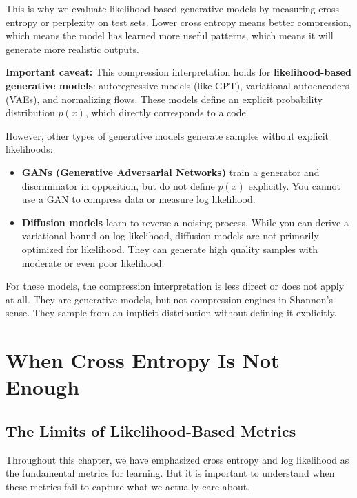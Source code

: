 This is why we evaluate likelihood-based generative models by measuring cross entropy or perplexity on test sets. Lower cross entropy means better compression, which means the model has learned more useful patterns, which means it will generate more realistic outputs.

\textbf{Important caveat:} This compression interpretation holds for \textbf{likelihood-based generative models}: autoregressive models (like GPT), variational autoencoders (VAEs), and normalizing flows. These models define an explicit probability distribution $p(x)$, which directly corresponds to a code.

However, other types of generative models generate samples without explicit likelihoods:

\begin{itemize}
\item \textbf{GANs (Generative Adversarial Networks)} train a generator and discriminator in opposition, but do not define $p(x)$ explicitly. You cannot use a GAN to compress data or measure log likelihood.

\item \textbf{Diffusion models} learn to reverse a noising process. While you can derive a variational bound on log likelihood, diffusion models are not primarily optimized for likelihood. They can generate high quality samples with moderate or even poor likelihood.
\end{itemize}

For these models, the compression interpretation is less direct or does not apply at all. They are generative models, but not compression engines in Shannon's sense. They sample from an implicit distribution without defining it explicitly.

\vspace{2em}

\section{When Cross Entropy Is Not Enough}

\subsection{The Limits of Likelihood-Based Metrics}

Throughout this chapter, we have emphasized cross entropy and log likelihood as the fundamental metrics for learning. But it is important to understand when these metrics fail to capture what we actually care about.

